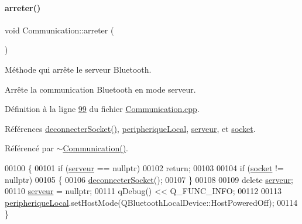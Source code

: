 \paragraph{\texorpdfstring{arreter()}{arreter()}}
{\footnotesize\ttfamily void Communication\+::arreter (\begin{DoxyParamCaption}{ }\end{DoxyParamCaption})}



Méthode qui arrête le serveur Bluetooth. 

Arrête la communication Bluetooth en mode serveur. 

Définition à la ligne \hyperlink{_communication_8cpp_source_l00099}{99} du fichier \hyperlink{_communication_8cpp_source}{Communication.\+cpp}.



Références \hyperlink{_communication_8cpp_source_l00133}{deconnecter\+Socket()}, \hyperlink{_communication_8h_source_l00053}{peripherique\+Local}, \hyperlink{_communication_8h_source_l00051}{serveur}, et \hyperlink{_communication_8h_source_l00052}{socket}.



Référencé par \hyperlink{_communication_8cpp_source_l00032}{$\sim$\+Communication()}.


\begin{DoxyCode}
00100 \{    
00101     \textcolor{keywordflow}{if} (\hyperlink{class_communication_a6384747297d6efa9e8fd2fc79ed0c269}{serveur} == \textcolor{keyword}{nullptr})
00102         \textcolor{keywordflow}{return};
00103 
00104     \textcolor{keywordflow}{if} (\hyperlink{class_communication_aa4ddc3151b305db0135d5826384645cc}{socket} != \textcolor{keyword}{nullptr})
00105     \{
00106         \hyperlink{class_communication_a5280c11bea5ead32e7a7101fd5b0f9b2}{deconnecterSocket}();
00107     \}
00108 
00109     \textcolor{keyword}{delete} \hyperlink{class_communication_a6384747297d6efa9e8fd2fc79ed0c269}{serveur};
00110     \hyperlink{class_communication_a6384747297d6efa9e8fd2fc79ed0c269}{serveur} = \textcolor{keyword}{nullptr};
00111     qDebug() << Q\_FUNC\_INFO;
00112 
00113     \hyperlink{class_communication_a2d643d199169dfe1d258df54d3ee5728}{peripheriqueLocal}.setHostMode(QBluetoothLocalDevice::HostPoweredOff);
00114 \}
\end{DoxyCode}
\mbox{\label{class_communication_af5444d470230a6e817ca8bc9484eb169}} 
